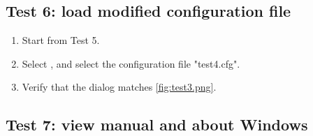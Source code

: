\subsection{Test 6: load modified configuration file}
\begin{enumerate}
\item Start from Test 5.
\item Select  \textrightarrow {}, and select the configuration file "test4.cfg".
\item Verify that the dialog matches \autoref{fig:test3.png}.
\end{enumerate}

\subsection{Test 7: view manual and about Windows}
